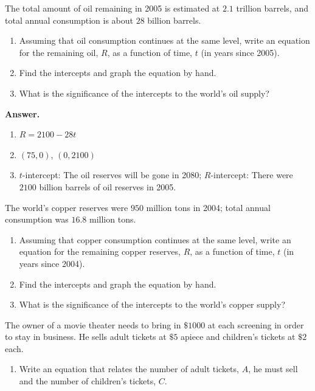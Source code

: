 \documentclass[10pt,]{book}
\theoremstyle{plain}
\theoremstyle{definition}
\theoremstyle{definition}
\theoremstyle{definition}
\theoremstyle{definition}
\numberwithin{equation}{part}
\begin{document}
\begin{exercisegroup}
%
\exercise[3.]\hypertarget{exercise-399}{}The total amount of oil remaining in 2005 is estimated at \(2.1\) trillion barrels, and total annual consumption is about \(28\) billion barrels. \leavevmode%
\begin{enumerate}[label=*\alph**]
\item\hypertarget{li-1545}{}Assuming that oil consumption continues at the same level, write an equation for the remaining oil, \(R\), as a function of time, \(t\) (in years since 2005).%
\item\hypertarget{li-1546}{}Find the intercepts and graph the equation by hand.%
\item\hypertarget{li-1547}{}What is the significance of the intercepts to the world's oil supply?%
\end{enumerate}
%
\par\smallskip
\noindent\textbf{Answer.}\hypertarget{answer-223}{}\quad
\leavevmode%
\begin{enumerate}[label=*\alph**]
\item\hypertarget{li-1548}{}\(R = 2100 - 28t\)%
\item\hypertarget{li-1549}{}\((75, 0)\), \((0, 2100)\)%
\item\hypertarget{li-1550}{}\(t\)-intercept: The oil reserves will be gone in 2080; \(R\)-intercept: There were \(2100\) billion barrels of oil reserves in 2005.%
\end{enumerate}
%
\exercise[4.]\hypertarget{exercise-400}{}The world's copper reserves were \(950\) million tons in 2004; total annual consumption was \(16.8\) million tons. \leavevmode%
\begin{enumerate}[label=*\alph**]
\item\hypertarget{li-1551}{}Assuming that copper consumption continues at the same level, write an equation for the remaining copper reserves, \(R\), as a function of time, \(t\) (in years since 2004).%
\item\hypertarget{li-1552}{}Find the intercepts and graph the equation by hand.%
\item\hypertarget{li-1553}{}What is the significance of the intercepts to the world's copper supply?%
\end{enumerate}
%
\exercise[5.]\hypertarget{exercise-401}{}The owner of a movie theater needs to bring in \(\$1000\) at each screening in order to stay in business. He sells adult tickets at \(\$5\) apiece and children's tickets at \(\$2\) each. \leavevmode%
\begin{enumerate}[label=*\alph**]
\item\hypertarget{li-1554}{}Write an equation that relates the number of adult tickets, \(A\), he must sell and the number of children's tickets, \(C\).%

\end{enumerate}
\end{exercisegroup}
\end{document}
